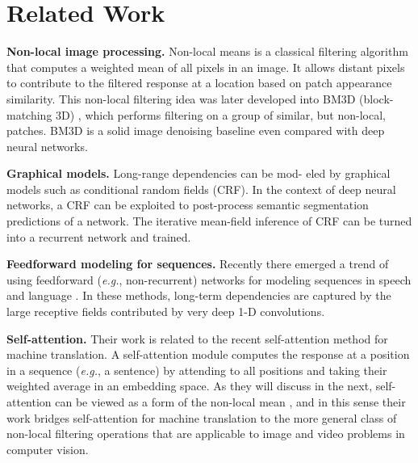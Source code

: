 \documentclass[10pt,twocolumn,letterpaper]{article}
\begin{document}
\section{Related Work}
\noindent \textbf{Non-local image processing.} Non-local means \cite{buades2005non} is a classical filtering algorithm that computes a weighted mean of
all pixels in an image. It allows distant pixels to contribute to
the filtered response at a location based on patch appearance
similarity. This non-local filtering idea was later developed
into BM3D (block-matching 3D) \cite{dabov2007image}, which performs filtering on a group of similar, but non-local, patches. BM3D is
a solid image denoising baseline even compared with deep
neural networks.
\par
\noindent \textbf{Graphical models.} Long-range dependencies can be mod-
eled by graphical models such as conditional random fields
(CRF). In the context of deep neural networks, a
CRF can be exploited to post-process semantic segmentation predictions of a network. The iterative mean-field
inference of CRF can be turned into a recurrent network
and trained.
\par
\noindent \textbf{Feedforward modeling for sequences.} Recently there
emerged a trend of using feedforward (\textit{e.g.}, non-recurrent)
networks for modeling sequences in speech and language \cite{gehring2017convolutional,van2016wavenet}
. In these methods, long-term dependencies
are captured by the large receptive fields contributed by
very deep 1-D convolutions.
\par
\noindent \textbf{Self-attention.}
Their work is related to the recent self-attention \cite{vaswani2017attention} method for machine translation. A self-attention module computes the response at a position in
a sequence (\textit{e.g.}, a sentence) by attending to all positions
and taking their weighted average in an embedding space.
As they will discuss in the next, self-attention can be viewed
as a form of the non-local mean \cite{buades2005non}, and in this sense their
work bridges self-attention for machine translation to the
more general class of non-local filtering operations that are
applicable to image and video problems in computer vision.




\end{document}
